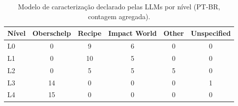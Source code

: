 \begin{table}[h]
\centering
\caption{Modelo de caracterização declarado pelas LLMs por nível (PT-BR, contagem agregada).}
\label{tab:charmodel}
\begin{tabular}{lccccc}
\toprule
\textbf{Nível} & \textbf{Oberschelp} & \textbf{Recipe} & \textbf{Impact World} & \textbf{Other} & \textbf{Unspecified} \\
\midrule
L0 & 0 & 9 & 6 & 0 & 0 \\
L1 & 0 & 10 & 5 & 0 & 0 \\
L2 & 0 & 5 & 5 & 5 & 0 \\
L3 & 14 & 0 & 0 & 0 & 1 \\
L4 & 15 & 0 & 0 & 0 & 0 \\
\bottomrule
\end{tabular}
\end{table}